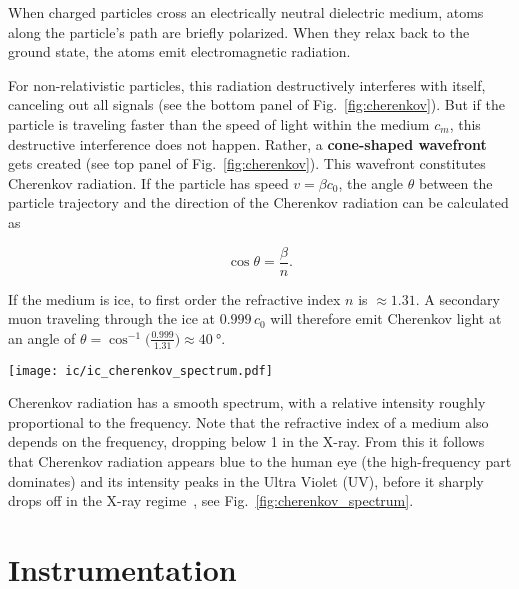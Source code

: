 When charged particles cross an electrically neutral dielectric medium, atoms along the particle's path are briefly polarized. When they relax back to the ground state, the atoms emit electromagnetic radiation.

For non-relativistic particles, this radiation destructively interferes with itself, canceling out all signals (see the bottom panel of Fig.~\ref{fig:cherenkov}). But if the particle is traveling faster than the speed of light within the medium $c_m$, this destructive interference does not happen. Rather, a \textbf{cone-shaped wavefront} gets created (see top panel of Fig.~\ref{fig:cherenkov}). This wavefront constitutes Cherenkov radiation. If the particle has speed $v=\beta c_0$, the angle $\theta$ between the particle trajectory and the direction of the Cherenkov radiation can be calculated as~

\begin{equation}
    \cos{\theta} = \frac{\beta}{n}.
\end{equation}

If the medium is ice, to first order the refractive index $n$ is $\approx1.31$. A secondary muon traveling through the ice at $0.999\,c_0$ will therefore emit Cherenkov light at an angle of $\theta = \cos^{-1}{\big(\frac{0.999}{1.31}\big)} \approx \SI{40}{\degree}$.
\begin{marginfigure}
    \texttt{[image: ic/ic\_cherenkov\_spectrum.pdf]}
    \caption[Cherenkov spectrum]{Cherenkov spectrum for a particle with $v=0.8 \,c_0$ in water. The intensity peaks at $\SI{4e15}{\Hz}$, corresponding to a wavelength of \SI{75}{\nm}, lying at the high-frequency end of the UV spectrum. Adapted from~\cite{Fulop1992}.}
\end{marginfigure}
Cherenkov radiation has a smooth spectrum, with a relative intensity roughly proportional to the frequency. Note that the refractive index of a medium also depends on the frequency, dropping below 1 in the X-ray. From this it follows that Cherenkov radiation appears blue to the human eye (the high-frequency part dominates) and its intensity peaks in the Ultra Violet (UV), before it sharply drops off in the X-ray regime~, see Fig.~\ref{fig:cherenkov_spectrum}.

\section{Instrumentation}

